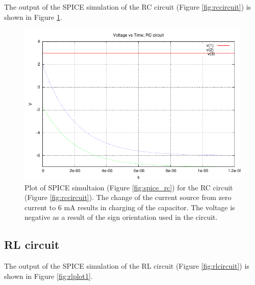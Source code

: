 \documentclass{article}
\begin{document}
The output of the SPICE simulation of the RC circuit (Figure \ref{fig:rccircuit})
is shown in Figure \ref{fig:plot1}.

\begin{figure}[!hbtp]
\center
\includegraphics[scale=1.0]{spice/plot-01}
\caption{Plot of SPICE simultaion (Figure \ref{fig:spice_rc}) for
the RC circuit (Figure \ref{fig:rccircuit}).
The change of the current source from zero current to 6 mA
results in charging of the capacitor.
The voltage is negative as a result of the sign orientation used
in the circuit.}
\label{fig:plot1}
\end{figure}
\nocite{GNUPLOT}

\clearpage

\subsection{RL circuit}

The output of the SPICE simulation of the RL circuit (Figure \ref{fig:rlcircuit})
is shown in Figure \ref{fig:rlplot1}.
\end{document}

